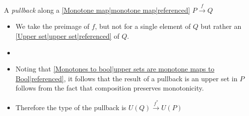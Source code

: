 

A \emph{pullback} along a \ref{Monotone map|monotone map|referenced} $P \xrightarrow{f} Q$

\begin{itemize}
    \item We take the preimage of $f$, but not for a single element of $Q$ but rather an \ref{Upper set|upper set|referenced} of $Q$.
    \item {}
    \item Noting that \ref{Monotones to bool|upper sets are monotone maps to Bool|referenced}, it follows that the result of a pullback is an upper set in $P$ follows from the fact that composition preserves monotonicity.
    \item Therefore the type of the pullback is $U(Q) \xrightarrow{f^*} U(P)$
\end{itemize}

